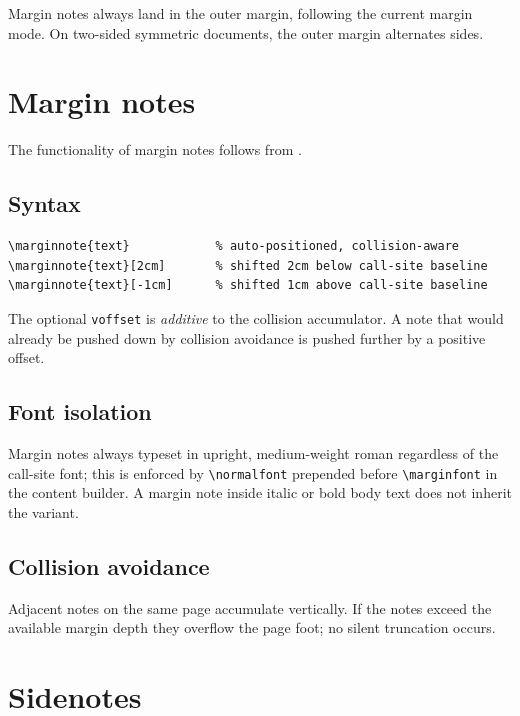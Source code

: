 \documentclass[11pt, twoside, openany]{book}
\newcommand{\cmd}[1]{\texttt{\textbackslash #1}}
\begin{document}
Margin notes always land in the outer margin, following the current margin mode. On two-sided symmetric documents, the outer margin alternates sides.

\section{Margin notes}\label{sec:marginnotes}

The functionality of margin notes follows from \cite{marginnote}.

\subsection{Syntax}\label{subsec:marginnotessyntax}

\begin{verbatim}
\marginnote{text}            % auto-positioned, collision-aware
\marginnote{text}[2cm]       % shifted 2cm below call-site baseline
\marginnote{text}[-1cm]      % shifted 1cm above call-site baseline
\end{verbatim}

The optional \texttt{voffset} is \emph{additive} to the collision accumulator. A note that would already be pushed down by collision avoidance is pushed further by a positive offset.

\subsection{Font isolation}\label{subsec:marginnotesfont}

Margin notes always typeset in upright, medium-weight roman regardless of the call-site font; this is enforced by \cmd{normalfont} prepended before \cmd{marginfont} in the content builder. A margin note inside italic or bold body text does not inherit the variant.

\subsection{Collision avoidance}\label{subsec:marginnotescollision}

Adjacent notes on the same page accumulate vertically. If the notes exceed the available margin depth they overflow the page foot; no silent truncation occurs.

\section{Sidenotes}\label{sec:sidenotes}
\end{document}
